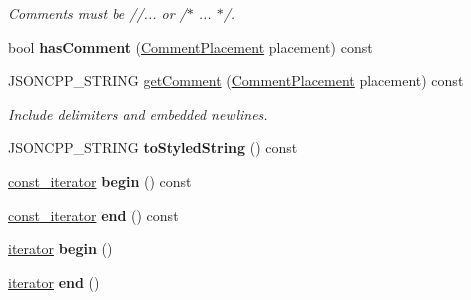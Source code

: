 \begin{DoxyCompactItemize}
\begin{DoxyCompactList}\small\item\em Comments must be //... or /$\ast$ ... $\ast$/. \end{DoxyCompactList}\item 
\mbox{\label{classJson_1_1Value_a65d8e3ab6a5871cbd019a3e0f0b944a3}} 
bool {\bfseries has\+Comment} (\hyperlink{namespaceJson_a4fc417c23905b2ae9e2c47d197a45351}{Comment\+Placement} placement) const
\item 
\mbox{\label{classJson_1_1Value_a82817229a986f0b254e31d5c83066ffe}} 
J\+S\+O\+N\+C\+P\+P\+\_\+\+S\+T\+R\+I\+NG \hyperlink{classJson_1_1Value_a82817229a986f0b254e31d5c83066ffe}{get\+Comment} (\hyperlink{namespaceJson_a4fc417c23905b2ae9e2c47d197a45351}{Comment\+Placement} placement) const
\begin{DoxyCompactList}\small\item\em Include delimiters and embedded newlines. \end{DoxyCompactList}\item 
\mbox{\label{classJson_1_1Value_a00154cc8662d7a845ed59e175c2496cb}} 
J\+S\+O\+N\+C\+P\+P\+\_\+\+S\+T\+R\+I\+NG {\bfseries to\+Styled\+String} () const
\item 
\mbox{\label{classJson_1_1Value_a015459a3950c198d63a2d3be8f5ae296}} 
\hyperlink{classJson_1_1ValueConstIterator}{const\+\_\+iterator} {\bfseries begin} () const
\item 
\mbox{\label{classJson_1_1Value_a3e443cd0ef24f7e028b175e47ee045e0}} 
\hyperlink{classJson_1_1ValueConstIterator}{const\+\_\+iterator} {\bfseries end} () const
\item 
\mbox{\label{classJson_1_1Value_a2d45bb2e68e8f22fe356d7d955ebd3c9}} 
\hyperlink{classJson_1_1ValueIterator}{iterator} {\bfseries begin} ()
\item 
\mbox{\label{classJson_1_1Value_a2f961eff73f7f79cd29260b6cbd42558}} 
\hyperlink{classJson_1_1ValueIterator}{iterator} {\bfseries end} ()
\item 
\mbox{\label{classJson_1_1Value_a92e32ea0f4f8a15853a3cf0beac9feb9}} 

\end{DoxyCompactItemize}
